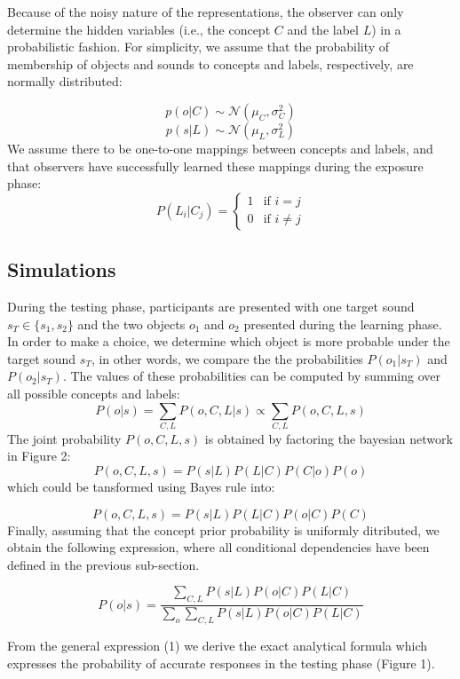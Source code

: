 \documentclass[10pt, letterpaper]{article}
\begin{document}
Because of the noisy nature of the representations, the observer can
only determine the hidden variables (i.e., the concept \(C\) and the
label \(L\)) in a probabilistic fashion. For simplicity, we assume that
the probability of membership of objects and sounds to concepts and
labels, respectively, are normally distributed:

\[ p(o | C) \sim  \mathcal{N}(\mu_C, \sigma^2_C) \]
\[ p(s| L) \sim  \mathcal{N}(\mu_L, \sigma^2_L) \] We assume there to be
one-to-one mappings between concepts and labels, and that observers have
successfully learned these mappings during the exposure phase: \[
P(L_i|C_j) = 
\begin{cases}
  1 & \text{if  }  i=j \\  
  0  & \text{if  }  i\neq j 
\end{cases}
\]

\subsection{Simulations}\label{simulations}

During the testing phase, participants are presented with one target
sound \(s_T \in\{s_1, s_2\}\) and the two objects \(o_1\) and \(o_2\)
presented during the learning phase. In order to make a choice, we
determine which object is more probable under the target sound \(s_T\),
in other words, we compare the the probabilities \(P(o_1|s_T)\) and
\(P(o_2|s_T)\). The values of these probabilities can be computed by
summing over all possible concepts and labels:
\[P(o|s)=\sum_{C,L} P(o, C, L| s) \propto \sum_{C,L} P(o, C, L, s) \]
The joint probability \(P(o, C, L, s)\) is obtained by factoring the
bayesian network in Figure 2: \[P(o,C,L,s) = P(s|L)P(L|C)P(C|o)P(o) \]
which could be tansformed using Bayes rule into:

\[P(o,C,L,s) = P(s|L)P(L|C)P(o|C)P(C) \] Finally, assuming that the
concept prior probability is uniformly ditributed, we obtain the
following expression, where all conditional dependencies have been
defined in the previous sub-section.

\begin{equation}
P(o|s) = \frac{\sum_{C,L} P(s|L)P(o|C)P(L|C)}{\sum_{o} \sum_{C,L} P(s|L)P(o|C)P(L|C)}
\end{equation}

From the general expression (1) we derive the exact analytical formula
which expresses the probability of accurate responses in the testing
phase (Figure 1).
\end{document}
